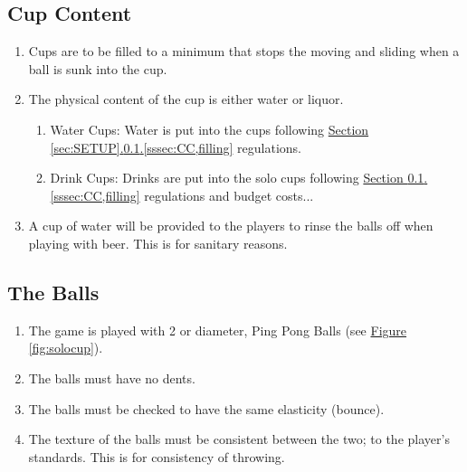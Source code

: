 	\subsection{Cup Content}\label{ssec:CupContent}
        \begin{enumerate}[label=(\roman*), ref=\roman*]
            \item \label{sssec:CC,filling} Cups are to be filled to a minimum that stops the moving and sliding when a ball is sunk into the cup. 
            \item \label{sssec:CC,w_vs_l} The physical content of the cup is either water or liquor.
                \begin{enumerate}[label=(\alph*), leftmargin=2cm]
                    \item Water Cups: Water is put into the cups following \hyperref[sssec:CC,filling]{Section \ref*{sec:SETUP}.\ref*{ssec:CupContent}.\ref*{sssec:CC,filling}} regulations.
                    \item Drink Cups: Drinks are put into the solo cups following \hyperref[sssec:CC,filling]{Section \ref*{ssec:CupContent}.\ref*{sssec:CC,filling}} regulations and budget costs...
                \end{enumerate} 
            \item \label{sssec:CC,rinse} A cup of water will be provided to the players to rinse the balls off when playing with beer. This is for sanitary reasons. 
        \end{enumerate}        
    \subsection{The Balls}\label{ssec:Balls}
        \begin{enumerate}[label=(\roman*), ref=\roman*]
            \item \label{sssec:Balls,num} The game is played with 2  or  diameter, Ping Pong Balls (see \hyperref[fig:solocup]{Figure \ref*{fig:solocup}}).
            \item \label{sssec:Balls,dents} The balls must have no dents. 
            \item \label{sssec:Balls,bounce} The balls must be checked to have the same elasticity (bounce). 
            \item \label{sssec:Balls,texture} The texture of the balls must be consistent between the two; to the player's standards. This is for consistency of throwing. 
        \end{enumerate}    
